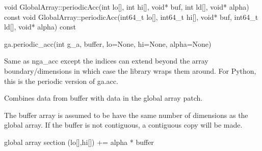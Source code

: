 \documentclass[12pt]{article}
\begin{document}
\begin{cxxapi}
\begin{cxxcode}
void GlobalArray::periodicAcc(int lo[], int hi[], void* buf,
                              int ld[], void* alpha) const
void GlobalArray::periodicAcc(int64_t lo[], int64_t hi[], void* buf,
                              int64_t ld[], void* alpha) const
\end{cxxcode}
\begin{funcargs}
\end{funcargs}
\end{cxxapi}

\begin{pyapi}
\begin{pycode}
ga.periodic_acc(int g_a, buffer, lo=None, hi=None, alpha=None)
\end{pycode}
\begin{funcargs}
\end{funcargs}
\end{pyapi}

\ncoll

\begin{desc}

Same as nga_acc except the indices can extend beyond the array
boundary/dimensions in which case the library wraps them around. For Python,
this is the periodic version of ga.acc.

Combines data from buffer with data in the global array patch.

The buffer array is assumed to be have the same number of dimensions as the
global array. If the buffer is not contiguous, a contiguous copy will be made.

global array section (lo[],hi[]) += alpha * buffer

\end{desc}


\end{document}
